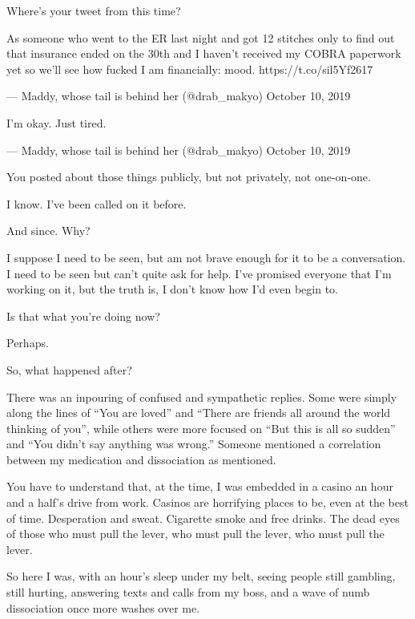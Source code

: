 \begin{ally}
Where's your tweet from this time?
\end{ally}
As someone who went to the ER last night and got 12 stitches only to find out that insurance ended on the 30th and I haven't received my COBRA paperwork yet so we'll see how fucked I am financially: mood. https://t.co/sil5Yf2617

--- Maddy, whose tail is behind her (@drab\_makyo) October 10, 2019

I'm okay. Just tired.

--- Maddy, whose tail is behind her (@drab\_makyo) October 10, 2019
\newpage

\begin{ally}
You posted about those things publicly, but not privately, not one-on-one.
\end{ally}
I know. I've been called on it before.

\begin{ally}
And since. Why?
\end{ally}
I suppose I need to be seen, but am not brave enough for it to be a conversation. I need to be seen but can't quite ask for help. I've promised everyone that I'm working on it, but the truth is, I don't know how I'd even begin to.

\begin{ally}
Is that what you're doing now?
\end{ally}
Perhaps.
\newpage

\begin{ally}
So, what happened after?
\end{ally}
There was an inpouring of confused and sympathetic replies. Some were simply along the lines of ``You are loved'' and ``There are friends all around the world thinking of you'', while others were more focused on ``But this is all so sudden'' and ``You didn't say anything was wrong.'' Someone mentioned a correlation between my medication and dissociation as mentioned.

You have to understand that, at the time, I was embedded in a casino an hour and a half's drive from work. Casinos are horrifying places to be, even at the best of time. Desperation and sweat. Cigarette smoke and free drinks. The dead eyes of those who must pull the lever, who must pull the lever, who must pull the lever.

So here I was, with an hour's sleep under my belt, seeing people still gambling, still hurting, answering texts and calls from my boss, and a wave of numb dissociation once more washes over me.

